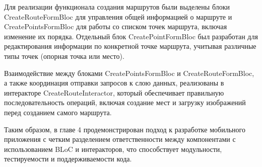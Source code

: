 Для реализации функционала создания маршрутов были выделены блоки CreateRouteFormBloc  для управления общей информацией о маршруте и CreatePointsFormBloc  для работы со списком точек маршрута, включая изменение их порядка. Отдельный блок CreatePointFormBloc  был разработан для редактирования информации по конкретной точке маршрута, учитывая различные типы точек (опорная точка или место).  

Взаимодействие между блоками CreatePointsFormBloc и CreateRouteFormBloc, а также координация отправки запросов к слою данных, реализованы в интеракторе CreateRouteInteractor, который обеспечивает правильную последовательность операций, включая создание мест и загрузку изображений перед созданием самого маршрута.  

Таким образом, в главе 4 продемонстрирован подход к разработке мобильного приложения с четким разделением ответственности между компонентами с использованием BLoC и интеракторов, что способствует модульности, тестируемости и поддерживаемости кода.


